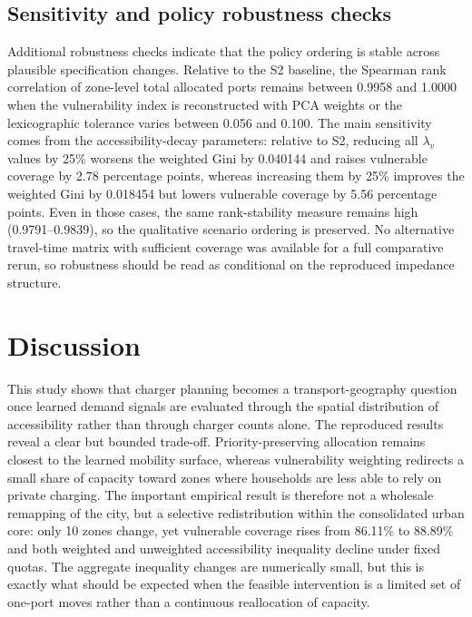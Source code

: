 \documentclass[final,5p,times,twocolumn,authoryear]{elsarticle}
\begin{document}
\subsection{Sensitivity and policy robustness checks}

Additional robustness checks indicate that the policy ordering is stable across plausible
specification changes. Relative to the S2 baseline, the Spearman rank correlation of
zone-level total allocated ports remains between 0.9958 and 1.0000 when the vulnerability
index is reconstructed with PCA weights or the lexicographic tolerance varies between 0.056
and 0.100. The main sensitivity comes from the accessibility-decay parameters: relative to
S2, reducing all $\lambda_v$ values by 25\% worsens the weighted Gini by 0.040144 and
raises vulnerable coverage by 2.78 percentage points, whereas increasing them by 25\%
improves the weighted Gini by 0.018454 but lowers vulnerable coverage by 5.56 percentage
points. Even in those cases, the same rank-stability measure remains high (0.9791--0.9839),
so the qualitative scenario ordering is preserved. No alternative travel-time matrix with
sufficient coverage was available for a full comparative rerun, so robustness should be read
as conditional on the reproduced impedance structure.

\section{Discussion}

This study shows that charger planning becomes a transport-geography question once learned
demand signals are evaluated through the spatial distribution of accessibility rather than
through charger counts alone. The reproduced results reveal a clear but bounded trade-off.
Priority-preserving allocation remains closest to the learned mobility surface, whereas
vulnerability weighting redirects a small share of capacity toward zones where households
are less able to rely on private charging. The important empirical result is therefore not a
wholesale remapping of the city, but a selective redistribution within the consolidated
urban core: only 10 zones change, yet vulnerable coverage rises from 86.11\% to 88.89\%
and both weighted and unweighted accessibility inequality decline under fixed quotas.
The aggregate inequality changes are numerically small, but this is exactly what should be
expected when the feasible intervention is a limited set of one-port moves rather than a
continuous reallocation of capacity.
\end{document}
